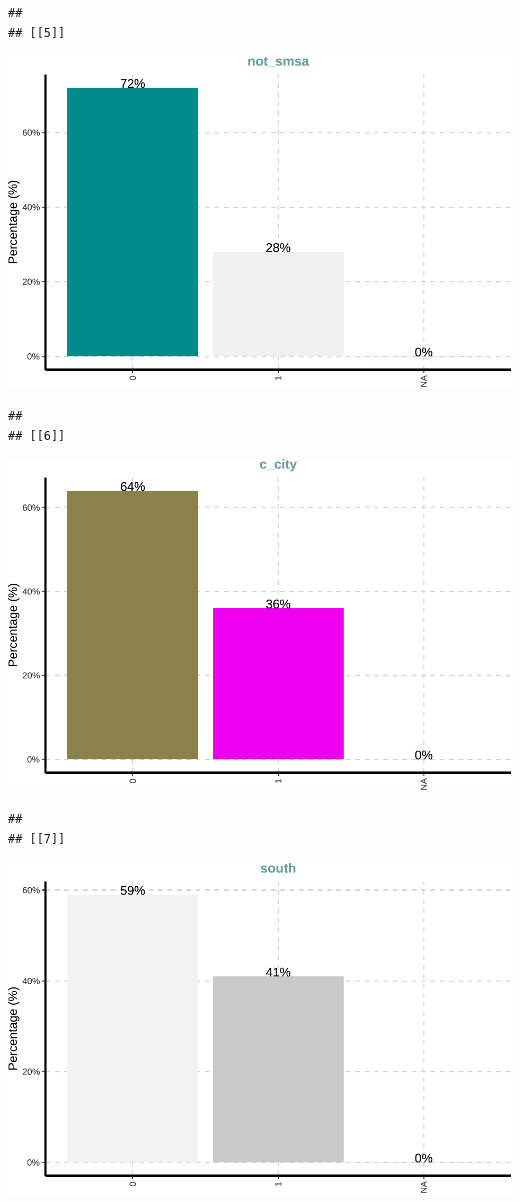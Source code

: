 \documentclass[
]{article}
\begin{document}
\begin{verbatim}
## 
## [[5]]
\end{verbatim}

\includegraphics{notebook_panel_data_files/figure-latex/Exploratory data analysis-5.pdf}

\begin{verbatim}
## 
## [[6]]
\end{verbatim}

\includegraphics{notebook_panel_data_files/figure-latex/Exploratory data analysis-6.pdf}

\begin{verbatim}
## 
## [[7]]
\end{verbatim}

\includegraphics{notebook_panel_data_files/figure-latex/Exploratory data analysis-7.pdf}
\end{document}
